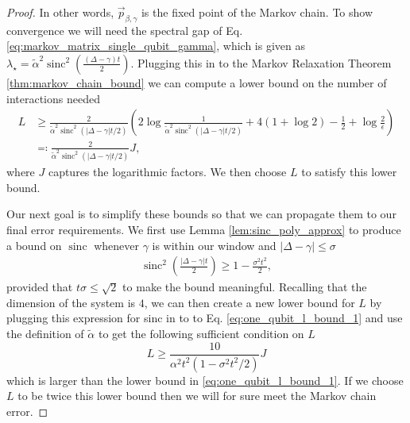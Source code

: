 \documentclass[
 amsmath,amssymb,
 aps,
onecolumn, 
nofootinbib]{revtex4-2}
\DeclareMathOperator{\sinc}{sinc}
\begin{document}
\begin{proof}
 In other words, $\vec{p}_{\beta,\gamma}$ is the fixed point of the Markov chain. To show convergence we will need the spectral gap of Eq. \eqref{eq:markov_matrix_single_qubit_gamma}, which is given as $\lambda_{\star} = \widetilde{\alpha}^2 \sinc^2 \left( \frac{(\Delta - \gamma) t}{2} \right)$. Plugging this in to the Markov Relaxation Theorem \ref{thm:markov_chain_bound} we can compute a lower bound on the number of interactions needed 
 \begin{align}
     L &\ge \frac{2}{\widetilde{\alpha}^2 \sinc^2(|\Delta - \gamma|t/2)} \left( 2 \log \frac{1}{\widetilde{\alpha}^2 \sinc^2(|\Delta - \gamma|t/2)} + 4( 1 + \log 2) - \frac{1}{2} + \log \frac{2}{\epsilon} \right) \\
     &\eqqcolon \frac{2}{\widetilde{\alpha}^2 \sinc^2(|\Delta - \gamma| t/2)} J, \label{eq:one_qubit_l_bound_1}
 \end{align}
where $J$ captures the logarithmic factors.  We then choose $L$ to satisfy this lower bound.
 
 Our next goal is to simplify these bounds so that we can propagate them to our final error requirements. We first use Lemma \ref{lem:sinc_poly_approx} to produce a  bound on $\sinc$ whenever $\gamma$ is within our window and $|\Delta - \gamma| \le \sigma$
 \begin{align}
     \sinc^2\left( \frac{|\Delta - \gamma| t}{2} \right) \ge 1 - \frac{\sigma^2 t^2}{2},
 \end{align}
 provided that $t \sigma \le \sqrt{2}$ to make the bound meaningful. Recalling that the dimension of the system is $4$, we can then create a new lower bound for $L$ by plugging this expression for sinc in to to Eq. \eqref{eq:one_qubit_l_bound_1} and use  the definition of $\tilde{\alpha}$ to get the following sufficient condition on $L$
 \begin{equation}
     L \ge \frac{10}{\alpha^2 t^2(1 - \sigma^2 t^2 / 2)} J \label{eq:single_qubit_l_bound_2}
 \end{equation} which is larger than the lower bound in \eqref{eq:one_qubit_l_bound_1}. If we choose $L$ to be twice this lower bound then we will for sure meet the Markov chain error.   
 

\end{proof}
\end{document}
